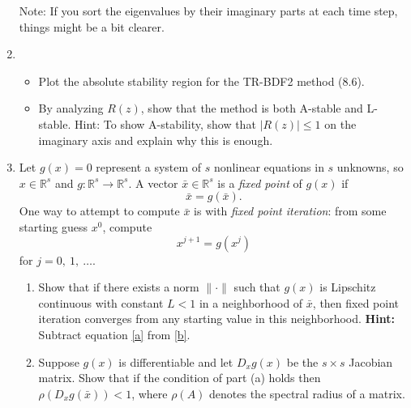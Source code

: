 \documentclass[10pt]{amsart}
\newcommand{\reals}{\mathbb R}
\begin{document}
\begin{enumerate}[label={\bf Problem~{\arabic*}:}]
\noindent
Note: If you sort the eigenvalues by their imaginary parts at each time step, things might be a bit clearer.

\mline

\item
  \begin{itemize}
    \item Plot the absolute stability region for the TR-BDF2 method (8.6).
  

    \item By analyzing $R(z)$, show 
that the method is both A-stable and L-stable.
Hint: To show A-stability, show that $|R(z)| \leq 1$ on the imaginary axis
and explain why this is enough.
\end{itemize}

\mline

\item Let $g(x)=0$ represent a system of $s$ nonlinear equations in $s$ unknowns,
so $x\in\reals^s$ and $g: \reals^s \to \reals^s$.  A vector $\bar
x\in\reals^s$ is a {\em fixed point} of $g(x)$ if 
\begin{equation}\label{a}
\bar x = g(\bar x).
\end{equation}
One way to attempt to compute $\bar x$ is with {\em fixed point iteration}:
from some starting guess $x^0$, compute
\begin{equation}\label{b}
x^{j+1} = g(x^j)
\end{equation}
for $j=0,~1,~\ldots$.

\begin{enumerate}
\item Show that if there exists a norm $\|\cdot\|$ such that $g(x)$ is
Lipschitz continuous with constant $L<1$ in a neighborhood of $\bar x$, then
fixed point iteration converges from any starting value in this
neighborhood.
{\bf Hint:} Subtract equation \eqref{a} from \eqref{b}.


\item Suppose $g(x)$ is differentiable and let $D_xg(x)$ be the $s\times s$
Jacobian matrix.  Show that if the condition of part (a) holds then
$\rho(D_xg(\bar x)) < 1$, where $\rho(A)$ denotes the spectral radius of a
matrix.


\end{enumerate}
\end{enumerate}
\end{document}

